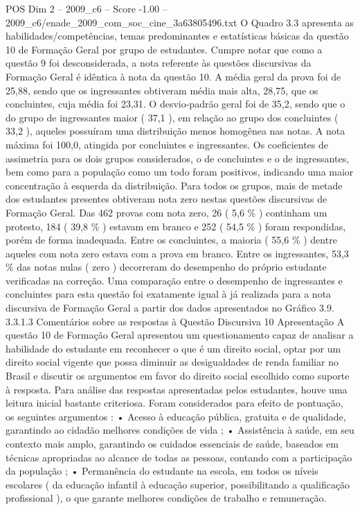 \begin{textsample}{POS Dim 2 – 2009\_c6 – Score -1.00 – 2009\_c6/enade\_2009\_com\_soc\_cine\_3a63805496.txt}
O Quadro 3.3 apresenta as habilidades/competências, temas predominantes e estatísticas básicas da questão 10 de Formação Geral por grupo de estudantes.
Cumpre notar que como a questão 9 foi desconsiderada, a nota referente às questões discursivas da Formação Geral é idêntica à nota da questão 10.
A média geral da prova foi de 25,88, sendo que os ingressantes obtiveram média mais alta, 28,75, que os concluintes, cuja média foi 23,31.
O desvio-padrão geral foi de 35,2, sendo que o do grupo de ingressantes maior ( 37,1 ), em relação ao grupo dos concluintes ( 33,2 ), aqueles possuíram uma distribuição menos homogênea nas notas.
A nota máxima foi 100,0, atingida por concluintes e ingressantes.
Os coeficientes de assimetria para os dois grupos considerados, o de concluintes e o de ingressantes, bem como para a população como um todo foram positivos, indicando uma maior concentração à esquerda da distribuição.
Para todos os grupos, mais de metade dos estudantes presentes obtiveram nota zero nestas questões discursivas de Formação Geral.
Das 462 provas com nota zero, 26 ( 5,6 \% ) continham um protesto, 184 ( 39,8 \% ) estavam em branco e 252 ( 54,5 \% ) foram respondidas, porém de forma inadequada.
Entre os concluintes, a maioria ( 55,6 \% ) dentre aqueles com nota zero estava com a prova em branco.
Entre os ingressantes, 53,3 \% das notas nulas ( zero ) decorreram do desempenho do próprio estudante verificadas na correção.
Uma comparação entre o desempenho de ingressantes e concluintes para esta questão foi exatamente igual à já realizada para a nota discursiva de Formação Geral a partir dos dados apresentados no Gráfico 3.9. 3.3.1.3 Comentários sobre as respostas à Questão Discursiva 10 Apresentação A questão 10 de Formação Geral apresentou um questionamento capaz de analisar a habilidade do estudante em reconhecer o que é um direito social, optar por um direito social vigente que possa diminuir as desigualdades de renda familiar no Brasil e discutir os argumentos em favor do direito social escolhido como suporte à resposta.
Para análise das respostas apresentadas pelos estudantes, houve uma leitura inicial bastante criteriosa.
Foram considerados para efeito de pontuação, os seguintes argumentos : • Acesso à educação pública, gratuita e de qualidade, garantindo ao cidadão melhores condições de vida ; • Assistência à saúde, em seu contexto mais amplo, garantindo os cuidados essenciais de saúde, baseados em técnicas apropriadas ao alcance de todas as pessoas, contando com a participação da população ; • Permanência do estudante na escola, em todos os níveis escolares ( da educação infantil à educação superior, possibilitando a qualificação profissional ), o que garante melhores condições de trabalho e remuneração.

\end{textsample}
